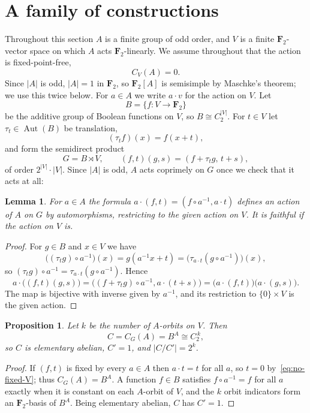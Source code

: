 \documentclass[11pt]{article}
\newtheorem{proposition}[theorem]{Proposition}
\newtheorem{lemma}[theorem]{Lemma}
\theoremstyle{definition}
\theoremstyle{remark}
\newcommand{\F}{\mathbf F}
\begin{document}
\section{A family of constructions}\label{sec:family}

Throughout this section $A$ is a finite group of odd order, and $V$ is a
finite $\F_2$-vector space on which $A$ acts $\F_2$-linearly.  We assume
throughout that the action is fixed-point-free,
\begin{equation}\label{eq:no-fixed-V}
 C_V(A)=0 .
\end{equation}
Since $|A|$ is odd, $|A|=1$ in $\F_2$, so $\F_2[A]$ is semisimple by
Maschke's theorem; we use this twice below.  For $a\in A$ we write
$a\cdot v$ for the action on $V$.
Let
\[
 B=\{f:V\to\F_2\}
\]
be the additive group of Boolean functions on $V$, so
$B\cong C_2^{|V|}$.  For $t\in V$ let $\tau_t\in\operatorname{Aut}(B)$
be translation,
\[
 (\tau_tf)(x)=f(x+t),
\]
and form the semidirect product
\[
 G=B\rtimes V,
 \qquad
 (f,t)(g,s)=(f+\tau_tg,\,t+s),
\]
of order $2^{|V|}\cdot|V|$.  Since $|A|$ is odd, $A$ acts coprimely
on $G$ once we check that it acts at all:

\begin{lemma}\label{lem:action}
For $a\in A$ the formula $a\cdot(f,t)=(f\circ a^{-1},a\cdot t)$ defines
an action of $A$ on $G$ by automorphisms, restricting to the given
action on $V$.  It is faithful if the action on $V$ is.
\end{lemma}

\begin{proof}
For $g\in B$ and $x\in V$ we have
\[
 \bigl((\tau_tg)\circ a^{-1}\bigr)(x)=g(a^{-1}x+t)
 =\bigl(\tau_{a\cdot t}(g\circ a^{-1})\bigr)(x),
\]
so $(\tau_tg)\circ a^{-1}=\tau_{a\cdot t}(g\circ a^{-1})$.  Hence
\[
 a\cdot\bigl((f,t)(g,s)\bigr)
 =\bigl((f+\tau_tg)\circ a^{-1},a\cdot(t+s)\bigr)
 =\bigl(a\cdot(f,t)\bigr)\bigl(a\cdot(g,s)\bigr).
\]
The map is bijective with inverse given by $a^{-1}$, and its
restriction to $\{0\}\times V$ is the given action.
\end{proof}

\begin{proposition}\label{prop:fixed-subgroup}
Let $k$ be the number of $A$-orbits on $V$.  Then
\[
 C=C_G(A)=B^A\cong C_2^{\,k},
\]
so $C$ is elementary abelian, $C'=1$, and $|C/C'|=2^k$.
\end{proposition}

\begin{proof}
If $(f,t)$ is fixed by every $a\in A$ then $a\cdot t=t$ for all $a$, so
$t=0$ by~\eqref{eq:no-fixed-V}; thus $C_G(A)=B^A$.  A function $f\in B$
satisfies $f\circ a^{-1}=f$ for all $a$ exactly when it is constant on each
$A$-orbit of $V$, and the $k$ orbit indicators form an $\F_2$-basis of
$B^A$.  Being elementary abelian, $C$ has $C'=1$.
\end{proof}
\end{document}
